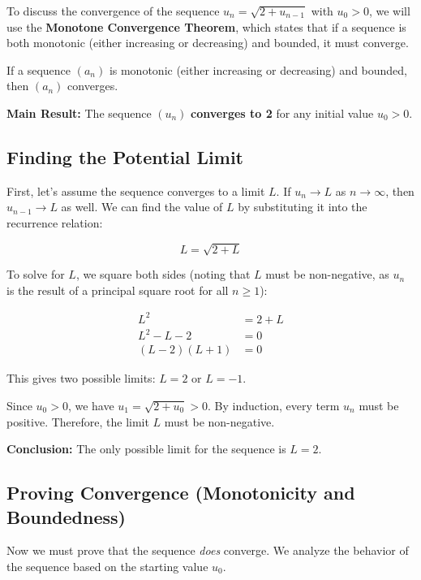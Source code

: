 \documentclass[12pt,a4paper]{article}
\theoremstyle{definition}
\begin{document}
To discuss the convergence of the sequence $u_n = \sqrt{2 + u_{n-1}}$ with $u_0 > 0$, we will use the \textbf{Monotone Convergence Theorem}, which states that if a sequence is both monotonic (either increasing or decreasing) and bounded, it must converge.

\begin{tcolorbox}[title=Monotone Convergence Theorem, colback=softivory, colframe=bookpurple, coltitle=white, fonttitle=\bfseries, boxrule=1.5pt, arc=4pt]
If a sequence $(a_n)$ is monotonic (either increasing or decreasing) and bounded, then $(a_n)$ converges.
\end{tcolorbox}

\textbf{Main Result:} The sequence $(u_n)$ \textbf{converges to 2} for any initial value $u_0 > 0$.

\subsection{Finding the Potential Limit}

First, let's assume the sequence converges to a limit $L$. If $u_n \to L$ as $n \to \infty$, then $u_{n-1} \to L$ as well. We can find the value of $L$ by substituting it into the recurrence relation:

\[
L = \sqrt{2 + L}
\]

To solve for $L$, we square both sides (noting that $L$ must be non-negative, as $u_n$ is the result of a principal square root for all $n \ge 1$):

\begin{align*}
L^2 &= 2 + L\\
L^2 - L - 2 &= 0\\
(L - 2)(L + 1) &= 0
\end{align*}

This gives two possible limits: $L = 2$ or $L = -1$.

Since $u_0 > 0$, we have $u_1 = \sqrt{2 + u_0} > 0$. By induction, every term $u_n$ must be positive. Therefore, the limit $L$ must be non-negative.

\textbf{Conclusion:} The only possible limit for the sequence is $L = 2$.

\subsection{Proving Convergence (Monotonicity and Boundedness)}

Now we must prove that the sequence \textit{does} converge. We analyze the behavior of the sequence based on the starting value $u_0$.
\end{document}
